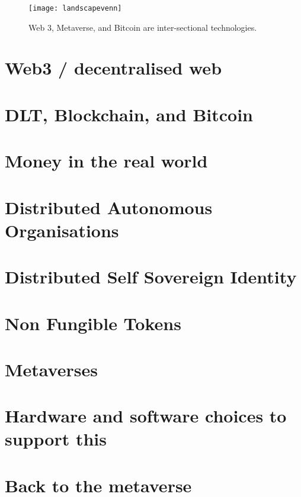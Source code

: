 \documentclass[
	11pt, %
	fleqn, %
	a4paper, %
]{LegrandOrangeBook}
\begin{document}
\begin{figure*}[ht]\centering %
	\texttt{[image: landscapevenn]}
	\caption{Web 3, Metaverse, and Bitcoin are inter-sectional technologies.}
	\label{fig:landscapevenn}
\end{figure*}
\chapter{Web3 / decentralised web}


\chapter{DLT, Blockchain, and Bitcoin}


\chapter{Money in the real world}


\chapter{Distributed Autonomous Organisations}


\chapter{Distributed Self Sovereign Identity}


\chapter{Non Fungible Tokens}


\chapter{Metaverses}


\chapter{Hardware and software choices to support this}


\chapter{Back to the metaverse }
\end{document}
